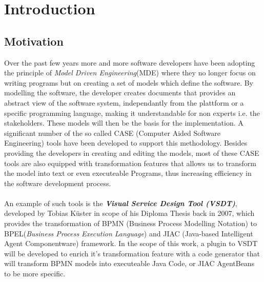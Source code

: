 \chapter{Introduction}

\section{Motivation}
\label{sec:Motivation}
Over the past few years more and more software developers have been adopting the principle of \textit{Model Driven Engineering}(MDE) where 
they no longer focus on writing programs but on creating a set of models which define the software. By modelling the software, the developer creates documents that provides an abstract view of the software system, independantly from the plattform or a specific programming language, making it understandable for non experts i.e. the stakeholders. These models will then be the basis for the implementation. A significant number of the so called  CASE (Computer Aided Software Engineering) tools have been developed to support this methodology. Besides providing the developers in creating and editing the models, most of these CASE tools are also equipped with transformation features that allows us to transform the model into text or even executeable Programs, thus increasing efficiency in the software development process. \\\\
An example of such tools is the \textbf{\textit{Visual Service Design Tool (VSDT)}}, developed by Tobias K\"uster in scope of his Diploma Thesis
back in 2007, which provides the transformation of BPMN (Business Process Modelling Notation) to BPEL(\textit{Business Process Execution Language}) and JIAC (Java-based Intelligent Agent Componentware) framework. In the scope of this work, a plugin to VSDT will be developed to enrich it's transformation feature with a code generator that will transform BPMN models into executeable Java Code, or JIAC AgentBeans to be more specific. 
\nocite{test}
